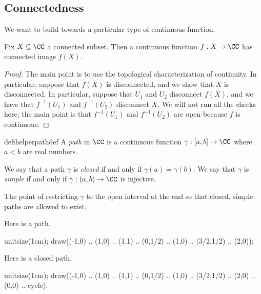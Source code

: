 \subsection{Connectedness}
We want to build towards a particular type of continuous function.
\begin{proposition} \label{prop:contconnectedimage}
	Fix $X\subseteq\CC$ a connected subset. Then a continuous function $f:X\to\CC$ has connected image $f(X)$.
\end{proposition}
\begin{proof}
	The main point is to use the topological characterization of continuity. In particular, suppose that $f(X)$ is disconnected, and we show that $X$ is disconnected. In particular, suppose that $U_1$ and $U_2$ disconnect $f(X)$, and we have that $f^{-1}(U_1)$ and $f^{-1}(U_2)$ disconnect $X$. We will not run all the checks here; the main point is that $f^{-1}(U_1)$ and $f^{-1}(U_2)$ are open because $f$ is continuous.
\end{proof}
\begin{restatable}[Path]{defihelper}{pathdef} 
	A \textit{path} in $\CC$ is a continuous function $\gamma:[a,b]\to\CC$ where $a<b$ are real numbers.
\end{restatable}
\begin{definition}
	We say that a path $\gamma$ is \textit{closed} if and only if $\gamma(a)=\gamma(b)$. We say that $\gamma$ is \textit{simple} if and only if $\gamma:(a,b)\to\CC$ is injective.
\end{definition}
\begin{remark}
	The point of restricting $\gamma$ to the open interval at the end so that closed, simple paths are allowed to exist.
\end{remark}
\begin{example}
	Here is a path.
	\begin{center}
		\begin{asy}
			unitsize(1cm);
			draw((-1,0) .. (1,0) .. (1,1) .. (0,1/2) .. (1,0) .. (3/2,1/2) .. (2,0));
		\end{asy}
	\end{center}
\end{example}
\begin{example}
	Here is a closed path.
	\begin{center}
		\begin{asy}
			unitsize(1cm);
			draw((-1,0) .. (1,0) .. (1,1) .. (0,1/2) .. (1,0) .. (3/2,1/2) .. (2,0) .. (0,0) .. cycle);
		\end{asy}
	\end{center}
\end{example}
